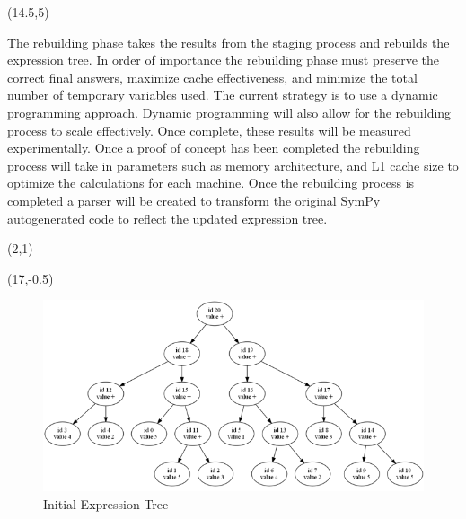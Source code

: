 \documentclass[landscape]{a0poster}
\def\Subhead#1{\noindent{\textbf{\Large\color{DarkBlue} #1}}\medskip}
\begin{document}
\begin{textblock}{30}
\begin{textblock}{14}(14.5,5)
	\Subhead{Rebuilding}%

	\vspace{-0.25in}
	The rebuilding phase takes the results from the staging process and rebuilds the expression tree. In order of importance the rebuilding phase must preserve the correct final answers, maximize cache effectiveness, and minimize the total number of temporary variables used. The current strategy is to use a dynamic programming approach. Dynamic programming will also allow for the rebuilding process to scale effectively. Once complete, these results will be measured experimentally. Once a proof of concept has been completed the rebuilding process will take in parameters such as memory architecture, and L1 cache size to optimize the calculations for each machine. Once the rebuilding process is completed a parser will be created to transform the original SymPy autogenerated code to reflect the updated expression tree.
	\begin{textblock}{12}(2,1)
	\end{textblock}	
\end{textblock}

\begin{textblock}{14}(17,-0.5)
	\begin{figure}
				\includegraphics[scale = 2.1]{tree1_initial.png}
				\caption{\large Initial Expression Tree}
	\end{figure}
\end{textblock}




\end{textblock}
\end{document}
